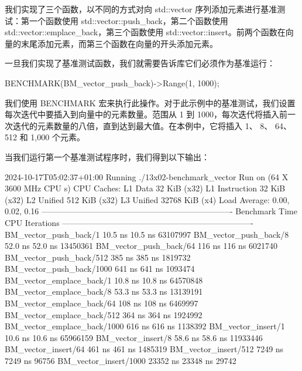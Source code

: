 我们实现了三个函数，以不同的方式对向 std::vector 序列添加元素进行基准测试：第一个函数使用 std::vector::push\_back，第二个函数使用 std::vector::emplace\_back，第三个函数使用 std::vector::insert。前两个函数在向量的末尾添加元素，而第三个函数在向量的开头添加元素。

一旦我们实现了基准测试函数，我们就需要告诉库它们必须作为基准运行：

\begin{cpp}
BENCHMARK(BM_vector_push_back)->Range(1, 1000);
\end{cpp}

我们使用 BENCHMARK 宏来执行此操作。对于此示例中的基准测试，我们设置每次迭代中要插入到向量中的元素数量。范围从 1 到 1000，每次迭代将插入前一次迭代的元素数量的八倍，直到达到最大值。在本例中，它将插入 1、 8、 64、 512 和 1,000 个元素。

当我们运行第一个基准测试程序时，我们得到以下输出：

\begin{shell}
2024-10-17T05:02:37+01:00
Running ./13x02-benchmark_vector
Run on (64 X 3600 MHz CPU s)
CPU Caches:
  L1 Data 32 KiB (x32)
  L1 Instruction 32 KiB (x32)
  L2 Unified 512 KiB (x32)
  L3 Unified 32768 KiB (x4)
Load Average: 0.00, 0.02, 0.16
----------------------------------------------------------------------
Benchmark                         Time               CPU    Iterations
----------------------------------------------------------------------
BM_vector_push_back/1          10.5 ns           10.5 ns      63107997
BM_vector_push_back/8          52.0 ns           52.0 ns      13450361
BM_vector_push_back/64          116 ns            116 ns       6021740
BM_vector_push_back/512         385 ns            385 ns       1819732
BM_vector_push_back/1000        641 ns            641 ns       1093474
BM_vector_emplace_back/1       10.8 ns           10.8 ns      64570848
BM_vector_emplace_back/8       53.3 ns           53.3 ns      13139191
BM_vector_emplace_back/64       108 ns            108 ns       6469997
BM_vector_emplace_back/512      364 ns            364 ns       1924992
BM_vector_emplace_back/1000     616 ns            616 ns       1138392
BM_vector_insert/1             10.6 ns           10.6 ns      65966159
BM_vector_insert/8             58.6 ns           58.6 ns      11933446
BM_vector_insert/64             461 ns            461 ns       1485319
BM_vector_insert/512           7249 ns           7249 ns         96756
BM_vector_insert/1000         23352 ns          23348 ns         29742
\end{shell}

